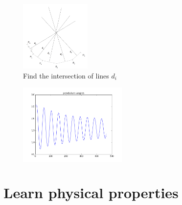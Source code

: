 \documentclass[11pt, oneside]{amsart}
\begin{document}
\begin{figure}[H]
  \captionsetup{labelformat=empty}
  \includegraphics[height=3.5cm]{find_center.png}
  \caption{Find the intersection of lines $d_i$}
\end{figure}

\begin{figure}[H]
  \includegraphics[height=4cm]{pendulum_angles.png}
\end{figure}

\section{Learn physical properties}
\end{document}
